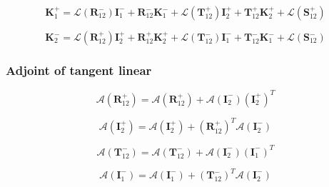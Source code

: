 \begin{equation}
\mathbf{K}^{+}_{1} = \mathcal{L}(\mathbf{R}^{-}_{12})\mathbf{I}^{-}_{1} + \mathbf{R}^{-}_{12}\mathbf{K}^{-}_{1} + \mathcal{L}(\mathbf{T}^{+}_{12})\mathbf{I}^{+}_{2} + \mathbf{T}^{+}_{12}\mathbf{K}^{+}_{2} + \mathcal{L}(\mathbf{S}^{+}_{12})
\label{eq:radiance-slab_radiance-tangent_linear-b_K_p_0}
\end{equation}

\begin{equation}
\mathbf{K}^{-}_{2} = \mathcal{L}(\mathbf{R}^{+}_{12})\mathbf{I}^{+}_{2} + \mathbf{R}^{+}_{12}\mathbf{K}^{+}_{2} + \mathcal{L}(\mathbf{T}^{-}_{12})\mathbf{I}^{-}_{1} + \mathbf{T}^{-}_{12}\mathbf{K}^{-}_{1} + \mathcal{L}(\mathbf{S}^{-}_{12})
\label{eq:radiance-slab_radiance-tangent_linear-b_K_m_tau}
\end{equation}


%
\subsubsection{Adjoint of tangent linear}
\label{sec:radiance-slab_radiance-adjoint_of_tangent_linear}

\begin{equation}
\mathcal{A}(\mathbf{R}^{+}_{12}) = \mathcal{A}(\mathbf{R}^{+}_{12}) + \mathcal{A}(\mathbf{I}^{-}_{2})(\mathbf{I}^{+}_{2})^{T}
\label{eq:radiance-slab_radiance-adjoint_of_tangent_linear-R_p_12_a}
\end{equation}

\begin{equation}
\mathcal{A}(\mathbf{I}^{+}_{2}) = \mathcal{A}(\mathbf{I}^{+}_{2}) + (\mathbf{R}^{+}_{12})^{T}\mathcal{A}(\mathbf{I}^{-}_{2})
\label{eq:radiance-slab_radiance-adjoint_of_tangent_linear-I_p_2_a}
\end{equation}

\begin{equation}
\mathcal{A}(\mathbf{T}^{-}_{12}) = \mathcal{A}(\mathbf{T}^{-}_{12}) + \mathcal{A}(\mathbf{I}^{-}_{2})(\mathbf{I}^{-}_{1})^{T}
\label{eq:radiance-slab_radiance-adjoint_of_tangent_linear-T_m_12_a}
\end{equation}

\begin{equation}
\mathcal{A}(\mathbf{I}^{-}_{1}) = \mathcal{A}(\mathbf{I}^{-}_{1}) + (\mathbf{T}^{-}_{12})^{T}\mathcal{A}(\mathbf{I}^{-}_{2})
\label{eq:radiance-slab_radiance-adjoint_of_tangent_linear-T_m_12_a}
\end{equation}

